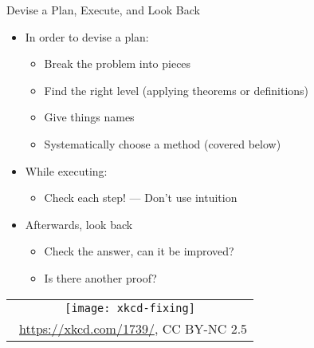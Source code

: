 \documentclass[../slides.tex]{subfiles}
\begin{document}
\begin{frame}{Devise a Plan, Execute, and Look Back}


	\begin{itemize}
	
		\item In order to devise a plan:

		\begin{itemize}
					
						\item Break the problem into pieces
						
						\item Find the right level (applying theorems or definitions)
						
						\item Give things names
						
						\item Systematically choose a method (covered below)
						
					\end{itemize}

		\item While executing:

				\begin{itemize}
					
						\item Check each step! --- Don't use intuition
					
					\end{itemize}
					
					
		\item Afterwards, look back
					
					
					
					\begin{itemize}
					
						\item Check the answer, can it be improved?
						
						\item Is there another proof?
					
					\end{itemize}
					
		\end{itemize}
		
		\begin{center}
		\begin{tabular}{c}
		\texttt{[image: xkcd-fixing]}\\[-1ex]
		{\tiny \textcopyright~\url{https://xkcd.com/1739/}, CC BY-NC 2.5}
		\end{tabular}
		\end{center}

\end{frame}
\end{document}
